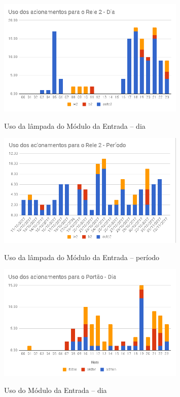 \begin{figure}[H]
	\centering
	\caption{Uso da lâmpada do Módulo da Entrada -- dia}
	\includegraphics[width=0.8\textwidth]{usoLampadaEntradaDia}
	\label{fig:usoLampadaEntradaDia}
\end{figure}

\begin{figure}[H]
	\centering
	\caption{Uso da lâmpada do Módulo da Entrada -- período}
	\includegraphics[width=0.8\textwidth]{UsoLampadaEntradaPeriodo}
	\label{fig:UsoLampadaEntradaPeriodo}
\end{figure}

\begin{figure}[H]
	\centering
	\caption{Uso do Módulo da Entrada -- dia}
	\includegraphics[width=0.8\textwidth]{usoacessodia}
	\label{fig:usoacessodia}
\end{figure}

